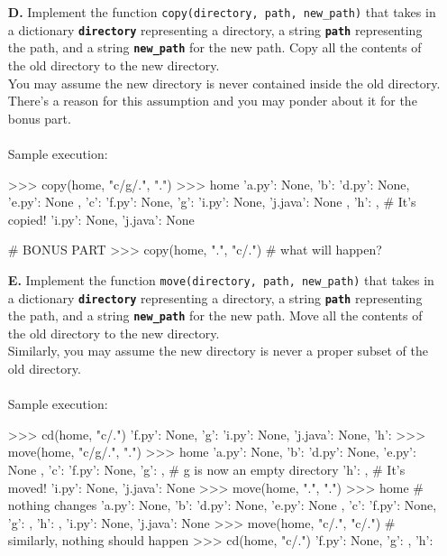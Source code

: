 \begin{enumerate}
\item[\textbf{D.}]
Implement the function \colorbox{CornflowerBlue!20}{\texttt{copy(directory, path, new\_path)}} that takes in a dictionary \texttt{\bfseries directory} representing a directory, 
a string \texttt{\bfseries path} representing the path, and a string \texttt{\bfseries new\_path} for the new path. Copy all the contents of the old directory to the new directory. \\ 
You may assume the new directory is never contained inside the old directory. There's a reason for this assumption and you may ponder about it for the bonus part. \\ \\
Sample execution:
\begin{python}
>>> copy(home, "c/g/.", ".")
>>> home
{
    'a.py': None,
    'b': {
        'd.py': None,
        'e.py': None
    },
    'c': {
        'f.py': None,
        'g': {
            'i.py': None,
            'j.java': None
        },
        'h': {}
    },
    # It's copied!
    'i.py': None,
    'j.java': None
}

# BONUS PART
>>> copy(home, ".", "c/.") # what will happen?
\end{python}
\begin{flushright}
    [5 + 2 marks]
\end{flushright}

\item[\textbf{E.}]
Implement the function \colorbox{CornflowerBlue!20}{\texttt{move(directory, path, new\_path)}} that takes in a dictionary \texttt{\bfseries directory} representing a directory, 
a string \texttt{\bfseries path} representing the path, and a string \texttt{\bfseries new\_path} for the new path. Move all the contents of the old directory to the new directory. \\
Similarly, you may assume the new directory is never a proper subset of the old directory.\\ \\
Sample execution:
\begin{python}
>>> cd(home, "c/.")
{'f.py': None, 'g': {'i.py': None, 'j.java': None}, 'h': {}}
>>> move(home, "c/g/.", ".")
>>> home
{
    'a.py': None,
    'b': {
        'd.py': None,
        'e.py': None
    },
    'c': {
        'f.py': None,
        'g': {}, # g is now an empty directory
        'h': {}
    },
    # It's moved!
    'i.py': None,
    'j.java': None
}
>>> move(home, ".", ".")
>>> home # nothing changes
{
    'a.py': None,
    'b': {
        'd.py': None,
        'e.py': None
    },
    'c': {
        'f.py': None,
        'g': {},
        'h': {}
    },
    'i.py': None,
    'j.java': None
}
>>> move(home, "c/.", "c/.") # similarly, nothing should happen
>>> cd(home, "c/.")
{'f.py': None, 'g': {}, 'h': {}}
\end{python}
\begin{flushright}
    [5 marks]
\end{flushright}
\end{enumerate}

